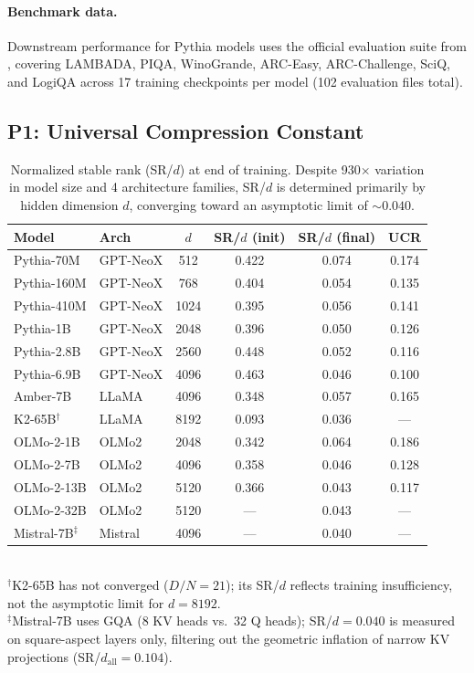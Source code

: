 \paragraph{Benchmark data.} Downstream performance for Pythia models uses the official evaluation suite from \citet{pythia}, covering LAMBADA, PIQA, WinoGrande, ARC-Easy, ARC-Challenge, SciQ, and LogiQA across 17 training checkpoints per model (102 evaluation files total).

\subsection{P1: Universal Compression Constant}
\label{sec:universal}

\begin{table}[t]
\centering
\small
\caption{Normalized stable rank (SR/$d$) at end of training. Despite 930$\times$ variation in model size and 4 architecture families, SR/$d$ is determined primarily by hidden dimension $d$, converging toward an asymptotic limit of ${\sim}0.040$.}
\label{tab:srd}
\begin{tabular}{@{}llcccc@{}}
\toprule
\textbf{Model} & \textbf{Arch} & $d$ & \textbf{SR/$d$ (init)} & \textbf{SR/$d$ (final)} & \textbf{UCR} \\
\midrule
Pythia-70M & GPT-NeoX & 512 & 0.422 & 0.074 & 0.174 \\
Pythia-160M & GPT-NeoX & 768 & 0.404 & 0.054 & 0.135 \\
Pythia-410M & GPT-NeoX & 1024 & 0.395 & 0.056 & 0.141 \\
Pythia-1B & GPT-NeoX & 2048 & 0.396 & 0.050 & 0.126 \\
Pythia-2.8B & GPT-NeoX & 2560 & 0.448 & 0.052 & 0.116 \\
Pythia-6.9B & GPT-NeoX & 4096 & 0.463 & 0.046 & 0.100 \\
Amber-7B & LLaMA & 4096 & 0.348 & 0.057 & 0.165 \\
K2-65B$^\dagger$ & LLaMA & 8192 & 0.093 & 0.036 & --- \\
OLMo-2-1B & OLMo2 & 2048 & 0.342 & 0.064 & 0.186 \\
OLMo-2-7B & OLMo2 & 4096 & 0.358 & 0.046 & 0.128 \\
OLMo-2-13B & OLMo2 & 5120 & 0.366 & 0.043 & 0.117 \\
OLMo-2-32B & OLMo2 & 5120 & --- & 0.043 & --- \\
Mistral-7B$^\ddagger$ & Mistral & 4096 & --- & 0.040 & --- \\
\bottomrule
\end{tabular}
\\[2pt]
{\footnotesize $^\dagger$K2-65B has not converged ($D/N = 21$); its SR/$d$ reflects training insufficiency, not the asymptotic limit for $d\!=\!8192$.}\\
{\footnotesize $^\ddagger$Mistral-7B uses GQA (8 KV heads vs.\ 32 Q heads); SR/$d=0.040$ is measured on square-aspect layers only, filtering out the geometric inflation of narrow KV projections (SR/$d_{\mathrm{all}}=0.104$).}
\end{table}


